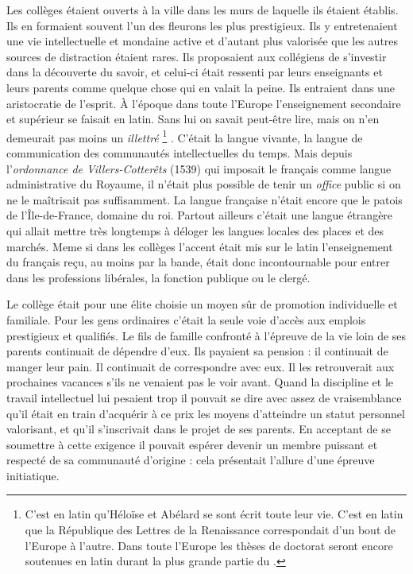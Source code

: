 Les collèges étaient ouverts à la ville dans les murs de laquelle ils étaient établis. Ils en formaient souvent l'un des fleurons les plus prestigieux. Ils y entretenaient une vie intellectuelle et mondaine active et d'autant plus valorisée que les autres sources de distraction étaient rares. Ils proposaient aux collégiens de s'investir dans la découverte du savoir, et celui-ci était ressenti par leurs enseignants et leurs parents comme quelque chose qui en valait la peine. Ils entraient dans une aristocratie de l'esprit. À l'époque dans toute l'Europe l'enseignement secondaire et supérieur se faisait en latin. Sans lui on savait peut-être lire, mais on n'en demeurait pas moins un \emph{illettré}%
\footnote{C'est en latin qu'Héloïse et Abélard se sont écrit toute leur vie. C'est en latin que la République des Lettres de la Renaissance correspondait d'un bout de l'Europe à l'autre. Dans toute l'Europe les thèses de doctorat seront encore soutenues en latin durant la plus grande partie du .}%
. C'était la langue vivante, la langue de communication des communautés intellectuelles du temps. Mais depuis l'\emph{ordonnance de Villers-Cotterêts} (1539) qui imposait le français comme langue administrative du Royaume, il n'était plus possible de tenir un \emph{office} public si on ne le maîtrisait pas suffisamment. La langue française n'était encore que le patois de l'Île-de-France, domaine du roi. Partout ailleurs c'était une langue étrangère qui allait mettre très longtemps à déloger les langues locales des places et des marchés. Meme si dans les collèges l'accent était mis sur le latin l'enseignement du français reçu, au moins par la bande, était donc incontournable pour entrer dans les professions libérales, la fonction publique ou le clergé. 


 Le collège était pour une élite choisie un moyen sûr de promotion individuelle et familiale. Pour les gens ordinaires c'était la seule voie d'accès aux emplois prestigieux et qualifiés. Le fils de famille confronté à l'épreuve de la vie loin de ses parents continuait de dépendre d'eux. Ils payaient sa pension : il continuait de manger leur pain. Il continuait de correspondre avec eux. Il les retrouverait aux prochaines vacances s'ils ne venaient pas le voir avant. Quand la discipline et le travail intellectuel lui pesaient trop il pouvait se dire avec assez de vraisemblance qu'il était en train d'acquérir à ce prix les moyens d'atteindre un statut personnel valorisant, et qu'il s'inscrivait dans le projet de ses parents. En acceptant de se soumettre à cette exigence il pouvait espérer devenir un membre puissant et respecté de sa communauté d'origine : cela présentait l'allure d'une épreuve initiatique.
 

